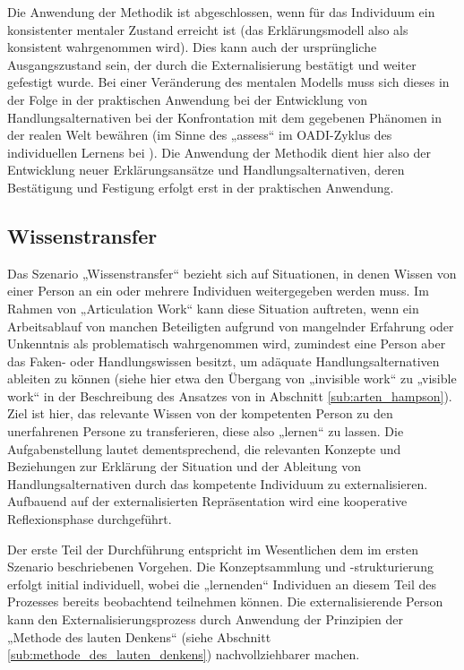 Die Anwendung der Methodik ist abgeschlossen, wenn für das Individuum ein konsistenter mentaler Zustand erreicht ist (das Erklärungsmodell also als konsistent wahrgenommen wird). Dies kann auch der ursprüngliche Ausgangszustand sein, der durch die Externalisierung bestätigt und weiter gefestigt wurde. Bei einer Veränderung des mentalen Modells muss sich dieses in der Folge in der praktischen Anwendung bei der Entwicklung von Handlungsalternativen bei der Konfrontation mit dem gegebenen Phänomen in der realen Welt bewähren (im Sinne des „assess“ im \gls{OADI}-Zyklus des individuellen Lernens bei \citet{Kim93}). Die Anwendung der Methodik dient hier also der Entwicklung neuer Erklärungsansätze und Handlungsalternativen, deren Bestätigung und Festigung erfolgt erst in der praktischen Anwendung.


\subsection{Wissenstransfer} %
\label{sub:wissenstransfer}

Das Szenario „Wissenstransfer“ bezieht sich auf Situationen, in denen Wissen von einer Person an ein oder mehrere Individuen weitergegeben werden muss. Im Rahmen von „Articulation Work“ kann diese Situation auftreten, wenn ein Arbeitsablauf von manchen Beteiligten aufgrund von mangelnder Erfahrung oder Unkenntnis als problematisch wahrgenommen wird, zumindest eine Person aber das Faken- oder Handlungswissen besitzt, um adäquate Handlungsalternativen ableiten zu können (siehe hier etwa den Übergang von „invisible work“ zu „visible work“ in der Beschreibung des Ansatzes von \citet{Hampson05} in Abschnitt \ref{sub:arten_hampson}). Ziel ist hier, das relevante Wissen von der kompetenten Person zu den unerfahrenen Persone zu transferieren, diese also „lernen“ zu lassen. Die Aufgabenstellung lautet dementsprechend, die relevanten Konzepte und Beziehungen zur Erklärung der Situation und der Ableitung von Handlungsalternativen durch das kompetente Individuum zu externalisieren. Aufbauend auf der externalisierten Repräsentation wird eine kooperative Reflexionsphase durchgeführt. 

Der erste Teil der Durchführung entspricht im Wesentlichen dem im ersten Szenario beschriebenen Vorgehen. Die Konzeptsammlung und -strukturierung erfolgt initial individuell, wobei die „lernenden“ Individuen an diesem Teil des Prozesses bereits beobachtend teilnehmen können. Die externalisierende Person kann den Externalisierungsprozess durch Anwendung der Prinzipien der „Methode des lauten Denkens“ (siehe Abschnitt \ref{sub:methode_des_lauten_denkens}) nachvollziehbarer machen. 

